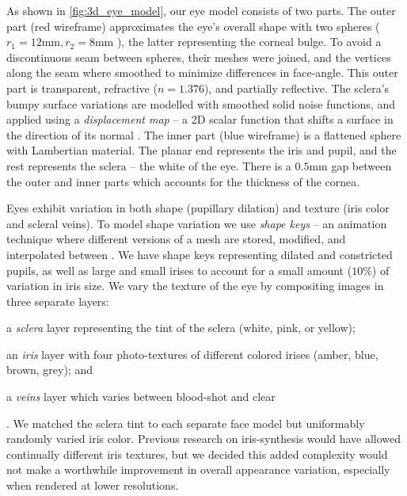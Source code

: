 As shown in \autoref{fig:3d_eye_model}, our eye model consists of two parts.
The outer part (red wireframe) approximates the eye's overall shape with two spheres ($r_1\!=\!12\textrm{mm}, r_2\!=\!8\textrm{mm}$ \cite{ruhland2014look}), the latter representing the corneal bulge.
To avoid a discontinuous seam between spheres, their meshes were joined, and the vertices along the seam where smoothed to minimize differences in face-angle.
This outer part is transparent, refractive ($n\!=\!1.376$), and partially reflective.
The sclera's bumpy surface variations are modelled with smoothed solid noise functions, and applied using a \emph{displacement map} -- a 2D scalar function that shifts a surface in the direction of its normal \cite{lee2000displaced}.
The inner part (blue wireframe) is a flattened sphere with Lambertian material.
The planar end represents the iris and pupil, and the rest represents the sclera -- the white of the eye.
There is a $0.5\textrm{mm}$ gap between the outer and inner parts which accounts for the thickness of the cornea.

Eyes exhibit variation in both shape (pupillary dilation) and texture (iris color and scleral veins).
To model shape variation we use \emph{shape keys} -- an animation technique where different versions of a mesh are stored, modified, and interpolated between \cite{orvalho2012facial}.
We have shape keys representing dilated and constricted pupils, as well as large and small irises to account for a small amount ($10\%$) of variation in iris size.
We vary the texture of the eye by compositing images in three separate layers:
\begin{inparaenum}
\item a \emph{sclera} layer representing the tint of the sclera (white, pink, or yellow);
\item an \emph{iris} layer with four photo-textures of different colored irises (amber, blue, brown, grey); and
\item a \emph{veins} layer which varies between blood-shot and clear
\end{inparaenum}.
We matched the sclera tint to each separate face model but uniformably randomly varied iris color.
Previous research on iris-synthesis  would have allowed continually different iris textures, but we decided this added complexity would not make a worthwhile improvement in overall appearance variation, especially when rendered at lower resolutions.

